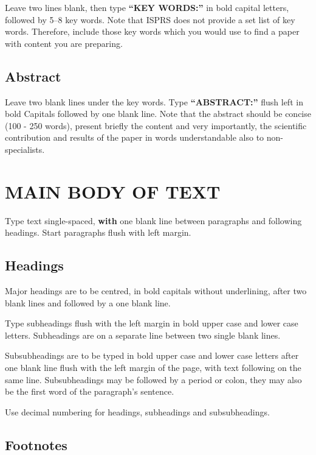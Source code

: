\documentclass{isprs} %
\begin{document}
Leave two lines blank, then type \textbf{``KEY WORDS:''}
in bold capital letters, followed by 5--8 key words. Note that ISPRS does not provide a set 
list of key words. Therefore, include those key words which you would 
use to find a paper with content you are preparing.


\subsection{Abstract}\label{sec:Abstract}

Leave two blank lines under the key words. Type \textbf{``ABSTRACT:''}
flush left in bold Capitals followed by one blank line. Note that the abstract should be concise (100 - 250 words), present briefly the content and very importantly, the scientific contribution and results of the paper in words understandable also to non-specialists.


\section{MAIN BODY OF TEXT}\label{sec:MAIN BODY OF TEXT}

Type text single-spaced, \textbf{with} one blank line between paragraphs and 
following headings. Start paragraphs flush with left margin.


\subsection{Headings}\label{sec:Headings}

Major headings are to be centred, in bold capitals without 
underlining, after two blank lines and followed by a one blank line.

Type subheadings flush with the left margin in bold upper case and lower 
case letters. Subheadings are on a separate line between two single blank lines.

Subsubheadings are to be typed in bold upper case and lower case letters 
after one blank line flush with the left margin of the page, with text 
following on the same line. Subsubheadings may be followed by a period 
or colon, they may also be the first word of the paragraph's sentence.

Use decimal numbering for headings, subheadings and subsubheadings.


\subsection{Footnotes}\label{sec:Footnotes}
\end{document}
